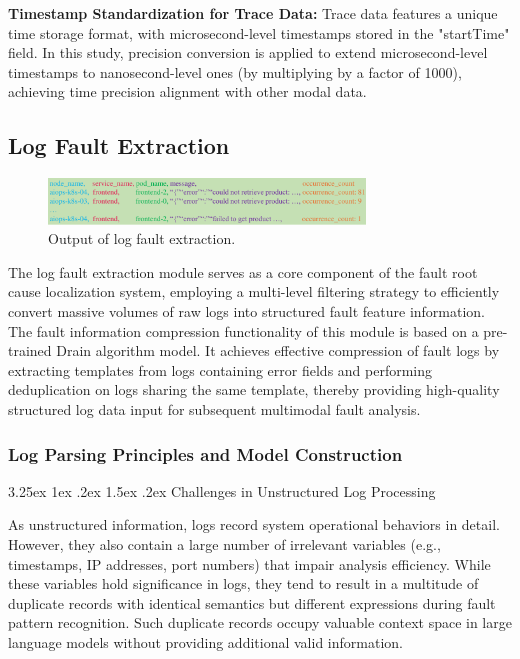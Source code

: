 \documentclass[10pt]{article}
\makeatletter
\renewcommand{\paragraph}{%
    \@startsection{paragraph}{4}{\z@}%
    {3.25ex \@plus1ex \@minus.2ex}%
    {1.5ex \@plus.2ex}%
    {\normalfont\normalsize\itshape}%
}
\makeatother
\begin{document}
\textbf{Timestamp Standardization for Trace Data:} Trace data features a unique time storage format, with microsecond-level timestamps stored in the "startTime" field. In this study, precision conversion is applied to extend microsecond-level timestamps to nanosecond-level ones (by multiplying by a factor of 1000), achieving time precision alignment with other modal data.

\subsection{Log Fault Extraction}

\begin{figure}[htbp]
    \centering
    \includegraphics[width=0.75\textwidth]{fig8.pdf}
    \caption{Output of log fault extraction.}
    \label{fig8}
\end{figure}

The log fault extraction module serves as a core component of the fault root cause localization system, employing a multi-level filtering strategy to efficiently convert massive volumes of raw logs into structured fault feature information. The fault information compression functionality of this module is based on a pre-trained Drain algorithm model. It achieves effective compression of fault logs by extracting templates from logs containing error fields and performing deduplication on logs sharing the same template, thereby providing high-quality structured log data input for subsequent multimodal fault analysis.

\subsubsection{Log Parsing Principles and Model Construction}

\paragraph{Challenges in Unstructured Log Processing}

As unstructured information, logs record system operational behaviors in detail. However, they also contain a large number of irrelevant variables (e.g., timestamps, IP addresses, port numbers) that impair analysis efficiency. While these variables hold significance in logs, they tend to result in a multitude of duplicate records with identical semantics but different expressions during fault pattern recognition. Such duplicate records occupy valuable context space in large language models without providing additional valid information.
\end{document}
